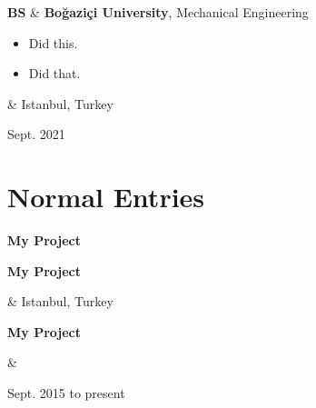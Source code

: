 \documentclass[10pt, letterpaper]{article}
\newenvironment{highlights}{
        \begin{itemize}[
                topsep=0pt,
                parsep=0.10 cm,
                partopsep=0pt,
                itemsep=0pt,
                after=\vspace{-1\baselineskip},
                leftmargin=0.4 cm + 3pt
            ]
    }{
        \end{itemize}
    } %
\let\originalTabularx\tabularx
\let\originalEndTabularx\endtabularx
\renewenvironment{tabularx}{\bgroup\centering\originalTabularx}{\originalEndTabularx\par\egroup}
\begin{document}
        \vspace{0.2 cm}
        \begin{tabularx}{
            \textwidth-0.4 cm-0.13cm
        }{
            L{0.85cm}
            K{0.2 cm}
            R{4.1 cm}
        }
            \textbf{BS}
            &
            \textbf{Boğaziçi University}, Mechanical Engineering

            \vspace{0.10 cm}

            \begin{highlights}
                \item Did this.
                \item Did that.
            \end{highlights}
            &
            Istanbul, Turkey

            Sept. 2021
        \end{tabularx}


    
    \section{Normal Entries}

        \begin{tabularx}{
            \textwidth-0.4 cm-0.13cm
        }{
            K{0.2 cm}
        }
            \textbf{My Project}

            \vspace{0.10 cm}

        \end{tabularx}


        \vspace{0.2 cm}
        \begin{tabularx}{
            \textwidth-0.4 cm-0.13cm
        }{
            K{0.2 cm}
            R{4.1 cm}
        }
            \textbf{My Project}

            \vspace{0.10 cm}

            &
            Istanbul, Turkey

            
        \end{tabularx}


        \vspace{0.2 cm}
        \begin{tabularx}{
            \textwidth-0.4 cm-0.13cm
        }{
            K{0.2 cm}
            R{4.1 cm}
        }
            \textbf{My Project}

            \vspace{0.10 cm}

            &
            

            Sept. 2015 to present
        \end{tabularx}
\end{document}
